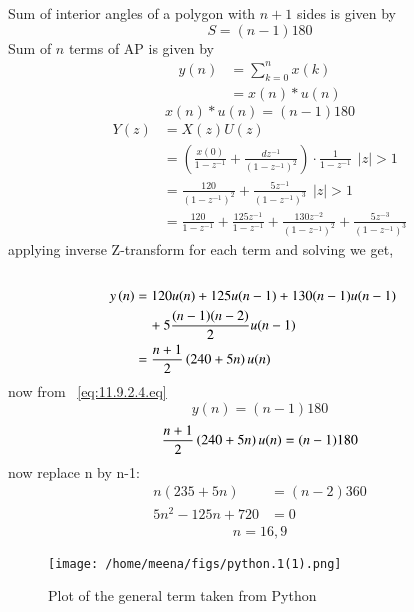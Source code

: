 \documentclass[journal,12pt,twocolumn]{IEEEtran}
\theoremstyle{remark}
\begin{document}
Sum of interior angles of a polygon with $n+1$ sides is given by
\begin{equation}
    S=(n-1)180
\end{equation}
Sum of $n$ terms of AP is given by
\begin{align}
    y(n)&=\sum_{k=0}^{n} x(k)\\
    &=x(n)*u(n)
\end{align}
\begin{equation}
    x(n)*u(n)=(n-1)180 \label{eq:11.9.2.4.eq}
\end{equation}
\begin{align}
    Y(z) &= X(z)U(z) \\
    &= \left(\frac{x(0)}{1-z^{-1}} + \frac{dz^{-1}}{(1-z^{-1})^2}\right)\cdot \frac{1}{1-z^{-1}}\hspace{5pt} |z|>1\\
    &=\frac{120}{(1-z^{-1})^2} + \frac{5z^{-1}}{(1-z^{-1})^3}\hspace{5pt} |z|>1\\
    &=\frac{120}{1-z^{-1}}+\frac{125 z^{-1}}{1-z^{-1}}+\frac{130z^{-2}}{(1-z^{-1})^2}+\frac{5 z^{-3}}{(1-z^{-1})^3}
\end{align}
applying inverse Z-transform for each term and solving we get,
\begin{align}\\
     y\left(n\right) &= 120 u(n) + 125u(n-1) + 130(n-1) u(n-1) \\
    &\quad + 5 \frac{(n-1)(n-2)}{2}u(n-1)\\
 &= \frac{n+1}{2}\left(240+5n\right)u(n)
\end{align}
now from ~\eqref{eq:11.9.2.4.eq} 
\begin{equation}
    y(n)=(n-1)180
\end{equation}
\begin{align}
    \frac{n+1}{2}\left(240+5n\right)u(n)=(n-1)180\\ 
\end{align}
now replace n by n-1: 
\begin{align}
    n(235+5n)&=(n-2)360\\
    5n^2-125n+720&=0
\end{align}
\begin{align}
   n=16,9
\end{align}
\begin{figure}[h]
\centering
 \texttt{[image: /home/meena/figs/python.1(1).png]} 
  \captionsetup{justification=centering}
  \caption{Plot of the general term taken from Python}
  \label{fig:your_label}
\end{figure}
\end{document}
